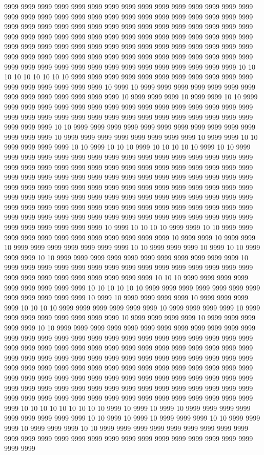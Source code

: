9999 9999 9999 9999 9999 9999 9999 9999 9999 9999 9999 9999 9999 9999 9999 9999 9999 9999 9999 9999 9999 9999 9999 9999 9999 9999 9999 9999 9999 9999 9999 9999 9999 9999 9999 9999 9999 9999 9999 9999 9999 9999 9999 9999 9999 9999 9999 9999 9999 9999 9999 9999 9999 9999 9999 9999 9999 9999 9999 9999 9999 9999 9999 9999 9999 9999 9999 9999 9999 9999 9999 9999 9999 9999 9999 9999 9999 9999 9999 9999 9999 9999 9999 9999 9999 9999 9999 9999 9999 9999 9999 9999 9999 9999 9999 9999 9999 9999 9999 9999 9999 9999 9999 9999 10 10 10 10 10 10 10 10 10 9999 9999 9999 9999 9999 9999 9999 9999 9999 9999 9999 9999 9999 9999 9999 9999 9999 10 9999 10 9999 9999 9999 9999 9999 9999 9999 9999 9999 9999 9999 9999 9999 9999 10 9999 9999 9999 10 9999 9999 10 10 9999 9999 9999 9999 9999 9999 9999 9999 9999 9999 9999 9999 9999 9999 9999 9999 9999 9999 9999 9999 9999 9999 9999 9999 9999 9999 9999 9999 9999 9999 9999 9999 9999 9999 10 10 9999 9999 9999 9999 9999 9999 9999 9999 9999 9999 9999 9999 9999 9999 10 9999 9999 9999 9999 9999 9999 9999 9999 10 9999 9999 10 10 9999 9999 9999 9999 10 10 9999 10 10 10 9999 10 10 10 10 10 9999 10 10 9999 9999 9999 9999 9999 9999 9999 9999 9999 9999 9999 9999 9999 9999 9999 9999 9999 9999 9999 9999 9999 9999 9999 9999 9999 9999 9999 9999 9999 9999 9999 9999 9999 9999 9999 9999 9999 9999 9999 9999 9999 9999 9999 9999 9999 9999 9999 9999 9999 9999 9999 9999 9999 9999 9999 9999 9999 9999 9999 9999 9999 9999 9999 9999 9999 9999 9999 9999 9999 9999 9999 9999 9999 9999 9999 9999 9999 9999 9999 9999 9999 9999 9999 9999 9999 9999 9999 9999 9999 9999 9999 9999 9999 9999 9999 9999 9999 9999 9999 9999 9999 9999 9999 9999 9999 9999 9999 9999 9999 9999 9999 9999 10 9999 10 10 10 10 9999 9999 10 10 9999 9999 9999 9999 9999 9999 9999 9999 9999 9999 9999 9999 10 9999 9999 10 9999 9999 10 9999 9999 9999 9999 9999 9999 9999 10 10 9999 9999 9999 10 9999 10 10 9999 9999 9999 10 10 9999 9999 9999 9999 9999 9999 9999 9999 9999 9999 9999 10 9999 9999 9999 9999 9999 9999 9999 9999 9999 9999 9999 9999 9999 9999 9999 9999 9999 9999 9999 9999 9999 9999 9999 9999 10 10 10 9999 9999 9999 9999 9999 9999 9999 9999 9999 10 10 10 10 10 10 9999 9999 9999 9999 9999 9999 9999 9999 9999 9999 9999 9999 10 9999 10 9999 9999 9999 9999 10 9999 9999 9999 9999 10 10 10 10 9999 9999 9999 9999 9999 9999 10 9999 9999 9999 9999 10 9999 9999 9999 9999 9999 9999 9999 9999 10 9999 9999 9999 9999 10 9999 9999 9999 9999 9999 10 10 9999 9999 9999 9999 9999 9999 9999 9999 9999 9999 9999 9999 9999 9999 9999 9999 9999 9999 9999 9999 9999 9999 9999 9999 9999 9999 9999 9999 9999 9999 9999 9999 9999 9999 9999 9999 9999 9999 9999 9999 9999 9999 9999 9999 9999 9999 9999 9999 9999 9999 9999 9999 9999 9999 9999 9999 9999 9999 9999 9999 9999 9999 9999 9999 9999 9999 9999 9999 9999 9999 9999 9999 9999 9999 9999 9999 9999 9999 9999 9999 9999 9999 9999 9999 9999 9999 9999 9999 9999 9999 9999 9999 9999 9999 9999 9999 9999 9999 9999 9999 9999 9999 9999 9999 9999 9999 9999 9999 9999 9999 9999 9999 9999 9999 9999 9999 9999 9999 10 10 10 10 10 10 10 10 10 9999 10 9999 10 9999 10 9999 9999 9999 9999 9999 9999 9999 9999 9999 10 10 9999 10 9999 10 9999 9999 9999 10 10 9999 9999 9999 10 9999 9999 9999 10 10 9999 9999 9999 9999 9999 9999 9999 9999 9999 9999 9999 9999 9999 9999 9999 9999 9999 9999 9999 9999 9999 9999 9999 9999 9999 9999 